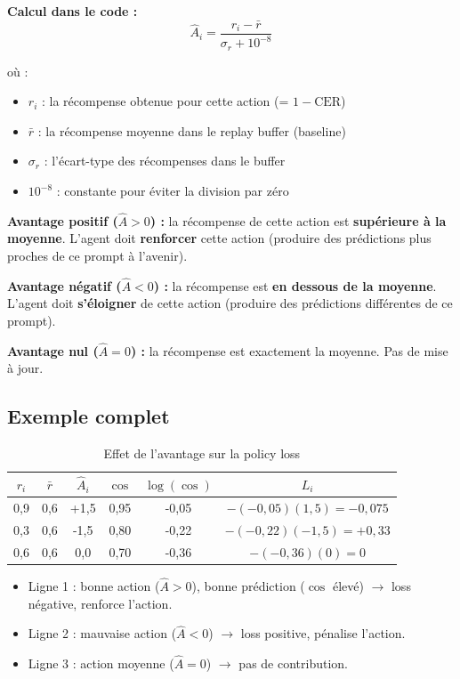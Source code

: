 \documentclass[11pt,a4paper]{article}
\begin{document}
\textbf{Calcul dans le code :}
\begin{equation}
\hat{A}_i = \frac{r_i - \bar{r}}{\sigma_r + 10^{-8}}
\end{equation}

où :
\begin{itemize}
    \item $r_i$ : la récompense obtenue pour cette action (= $1 - \text{CER}$)
    \item $\bar{r}$ : la récompense moyenne dans le replay buffer (baseline)
    \item $\sigma_r$ : l'écart-type des récompenses dans le buffer
    \item $10^{-8}$ : constante pour éviter la division par zéro
\end{itemize}

\textbf{Avantage positif ($\hat{A} > 0$) :} la récompense de cette action est \textbf{supérieure à la moyenne}. L'agent doit \textbf{renforcer} cette action (produire des prédictions plus proches de ce prompt à l'avenir).

\textbf{Avantage négatif ($\hat{A} < 0$) :} la récompense est \textbf{en dessous de la moyenne}. L'agent doit \textbf{s'éloigner} de cette action (produire des prédictions différentes de ce prompt).

\textbf{Avantage nul ($\hat{A} = 0$) :} la récompense est exactement la moyenne. Pas de mise à jour.

\subsection{Exemple complet}

\begin{table}[h]
\centering
\begin{tabular}{cccccc}
\toprule
$r_i$ & $\bar{r}$ & $\hat{A}_i$ & $\cos$ & $\log(\cos)$ & $L_i$ \\
\midrule
0{,}9 & 0{,}6 & +1{,}5 & 0{,}95 & -0{,}05 & $-(-0{,}05)(1{,}5) = -0{,}075$ \\
0{,}3 & 0{,}6 & -1{,}5 & 0{,}80 & -0{,}22 & $-(-0{,}22)(-1{,}5) = +0{,}33$ \\
0{,}6 & 0{,}6 & 0{,}0 & 0{,}70 & -0{,}36 & $-(-0{,}36)(0) = 0$ \\
\bottomrule
\end{tabular}
\caption{Effet de l'avantage sur la policy loss}
\end{table}

\begin{itemize}
    \item Ligne 1 : bonne action ($\hat{A} > 0$), bonne prédiction ($\cos$ élevé) $\rightarrow$ loss négative, renforce l'action.
    \item Ligne 2 : mauvaise action ($\hat{A} < 0$) $\rightarrow$ loss positive, pénalise l'action.
    \item Ligne 3 : action moyenne ($\hat{A} = 0$) $\rightarrow$ pas de contribution.
\end{itemize}
\end{document}
